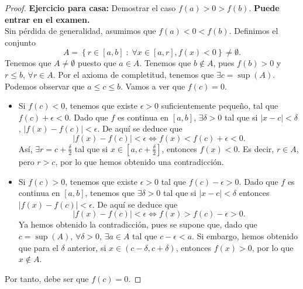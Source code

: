 \begin{proof}
\textbf{Ejercicio para casa:} Demostrar el caso $\displaystyle f\left(a\right) > 0 > f\left(b\right) $. \textbf{Puede entrar en el examen.} \\
Sin pérdida de generalidad, asumimos que $\displaystyle f\left(a\right) < 0 < f\left(b\right) $. Definimos el conjunto 
\[A = \left\{ r \in [a,b] \; : \; \forall x \in [a,r], f\left(x\right) < 0\right\} \neq \emptyset .\]
Tenemos que $\displaystyle A \neq \emptyset $ puesto que $\displaystyle a \in A $.
Tenemos que $\displaystyle b \not\in A $, pues $\displaystyle f\left(b\right) > 0 $ y $\displaystyle r \leq b $, $\displaystyle \forall r \in A $. Por el axioma de completitud, tenemos que $\displaystyle \exists c = \sup\left(A\right) $. Podemos observar que $\displaystyle a \leq c \leq b $. Vamos a ver que $\displaystyle f\left(c\right) = 0 $. 
\begin{itemize}
	\item Si $\displaystyle f\left(c\right) < 0 $, tenemos que existe $\displaystyle \epsilon > 0 $ suficientemente pequeño, tal que $\displaystyle f\left(c\right) + \epsilon < 0 $. Dado que $\displaystyle f $ es continua en $\displaystyle [a,b] $, $\displaystyle \exists \delta > 0 $ tal que si $\displaystyle \left|x - c\right| < \delta  $, $\displaystyle \left|f\left(x\right)-f\left(c\right)\right|<\epsilon  $. De aquí se deduce que
		\[ \left|f\left(x\right) - f\left(c\right)\right| < \epsilon \iff f\left(x\right) < f\left(c\right) + \epsilon < 0 .\]
		Así, $\displaystyle \exists r = c + \frac{\delta }{2} $ tal que si $\displaystyle x \in \left[a, c + \frac{\delta }{2}\right]  $, entonces $\displaystyle f\left(x\right) < 0 $. Es decir, $\displaystyle r \in A $, pero $\displaystyle r > c $, por lo que hemos obtenido una contradicción.
	\item Si $\displaystyle f\left(c\right) > 0 $, tenemos que existe $\displaystyle \epsilon > 0 $ tal que $\displaystyle f\left(c\right) - \epsilon > 0 $. Dado que $\displaystyle f $ es continua en $\displaystyle [a,b] $, tenemos que $\displaystyle \exists \delta > 0 $ tal que si $\displaystyle \left|x - c\right|< \delta  $ entonces $\displaystyle \left|f\left(x\right)-f\left(c\right)\right|<\epsilon  $. De aquí se deduce que 
		\[ \left|f\left(x\right)-f\left(c\right)\right| < \epsilon \iff f\left(x\right) > f\left(c\right) - \epsilon > 0 .\]
Ya hemos obtenido la contradicción, pues se supone que, dado que $\displaystyle c = \sup\left(A\right) $, $\displaystyle \forall \delta > 0 $, $\displaystyle \exists a \in A $ tal que $\displaystyle c - \epsilon < a $. Si embargo, hemos obtenido que para el $\displaystyle \delta  $ anterior, si $\displaystyle x \in \left(c - \delta, c + \delta \right) $, entonces $\displaystyle f\left(x\right) > 0 $, por lo que $\displaystyle x \not\in A $.
\end{itemize}
Por tanto, debe ser que $\displaystyle f\left(c\right) = 0 $.
\end{proof}
